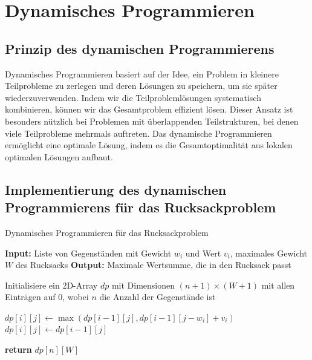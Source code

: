 \documentclass[12pt]{report}
\begin{document}
\newpage
\chapter{Dynamisches Programmieren}


\section{Prinzip des dynamischen Programmierens}
Dynamisches Programmieren basiert auf der Idee, ein Problem in kleinere Teilprobleme zu zerlegen und deren Lösungen zu speichern, um sie später wiederzuverwenden. Indem wir die Teilproblemlösungen systematisch kombinieren, können wir das Gesamtproblem effizient lösen. Dieser Ansatz ist besonders nützlich bei Problemen mit überlappenden Teilstrukturen, bei denen viele Teilprobleme mehrmals auftreten. Das dynamische Programmieren ermöglicht eine optimale Lösung, indem es die Gesamtoptimalität aus lokalen optimalen Lösungen aufbaut.\cite{cormen2022introduction}


\section{Implementierung des dynamischen Programmierens für das Rucksackproblem}
\begin{algorithm}
	\caption{Dynamisches Programmieren für das Rucksackproblem}
	\begin{algorithmic}[1]
		\State \textbf{Input:} Liste von Gegenständen mit Gewicht $w_i$ und Wert $v_i$, maximales Gewicht $W$ des Rucksacks
		\State \textbf{Output:} Maximale Wertsumme, die in den Rucksack passt
		
		\State Initialisiere ein 2D-Array $dp$ mit Dimensionen $(n+1) \times (W+1)$ mit allen Einträgen auf $0$, wobei $n$ die Anzahl der Gegenstände ist
		
		\State $dp[i][j] \gets \max(dp[i-1][j], dp[i-1][j-w_i] + v_i)$
		\Else
		\State $dp[i][j] \gets dp[i-1][j]$
		\EndIf
		\EndFor
		\EndFor
		
		\State \textbf{return} $dp[n][W]$
	\end{algorithmic}
\end{algorithm}
\end{document}
